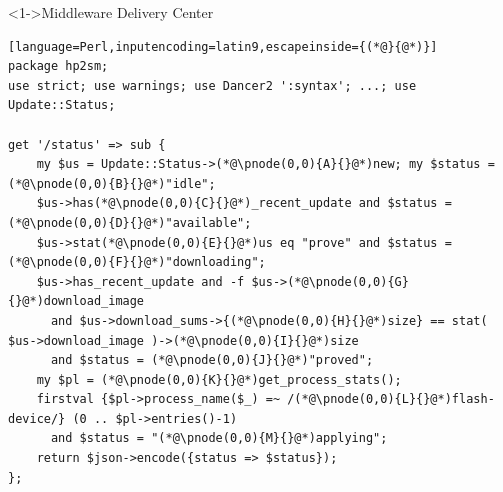 \documentclass[ngerman,xcolor={table,dvipsnames},smaller,compress,hyperref={bookmarks,colorlinks}]{beamer}%
\begin{document}
\begin{frame}[t,fragile]

\begin{block}<1->{Middleware Delivery Center}
\scriptsize
\begin{lstlisting}[language=Perl,inputencoding=latin9,escapeinside={(*@}{@*)}]
package hp2sm;
use strict; use warnings; use Dancer2 ':syntax'; ...; use Update::Status;

get '/status' => sub {
    my $us = Update::Status->(*@\pnode(0,0){A}{}@*)new; my $status = (*@\pnode(0,0){B}{}@*)"idle";
    $us->has(*@\pnode(0,0){C}{}@*)_recent_update and $status = (*@\pnode(0,0){D}{}@*)"available";
    $us->stat(*@\pnode(0,0){E}{}@*)us eq "prove" and $status = (*@\pnode(0,0){F}{}@*)"downloading";
    $us->has_recent_update and -f $us->(*@\pnode(0,0){G}{}@*)download_image
      and $us->download_sums->{(*@\pnode(0,0){H}{}@*)size} == stat( $us->download_image )->(*@\pnode(0,0){I}{}@*)size
      and $status = (*@\pnode(0,0){J}{}@*)"proved";
    my $pl = (*@\pnode(0,0){K}{}@*)get_process_stats();
    firstval {$pl->process_name($_) =~ /(*@\pnode(0,0){L}{}@*)flash-device/} (0 .. $pl->entries()-1)
      and $status = "(*@\pnode(0,0){M}{}@*)applying";
    return $json->encode({status => $status});
};
\end{lstlisting}
\end{block}

\begin{itemize}
\end{itemize}





\end{frame}
\end{document}
